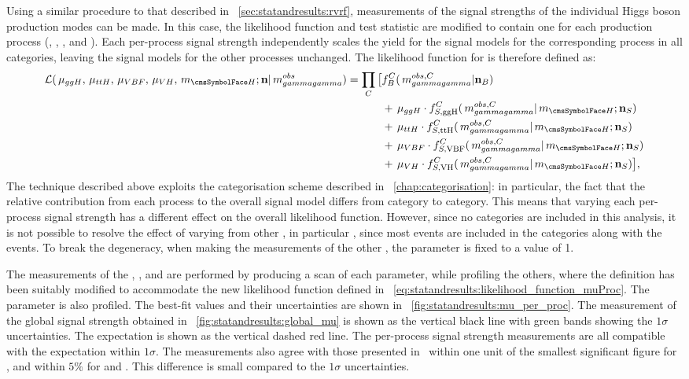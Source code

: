 Using a similar procedure to that described in \Sec~\ref{sec:statandresults:rvrf}, measurements of the signal strengths of the individual Higgs boson production modes can be made. In this case, the likelihood function and test statistic are modified to contain one \POI for each production process (\muggH, \muVBF, \muVH, and \muttH). Each per-process signal strength independently scales the yield for the signal models for the corresponding process in all categories, leaving the signal models for the other processes unchanged. The likelihood function for is therefore defined as:
\begin{equation}
\label{eq:statandresults:likelihood_function_muProc}
\begin{split}
\mathcal{L}(\muggH, \muttH,\muVBF,\muVH, \mH; \mathbf{n} | \mgg^{obs} ) = \prod_C \big[{} &f^C_B(\mgg^{obs,C} | \mathbf{n}_B ) \\ 
&+\muggH\cdot f^C_{S,{\text{ggH}}}(\mgg^{obs,C} |\mH; \mathbf{n}_S) \\ 
&+\muttH\cdot f^C_{S,{\text{ttH}}}(\mgg^{obs,C} |\mH; \mathbf{n}_S) \\ 
&+\muVBF\cdot f^C_{S,{\text{VBF}}}(\mgg^{obs,C} |\mH; \mathbf{n}_S) \\
&+\muVH \cdot f^C_{S,{\text{VH}}}(\mgg^{obs,C} |\mH; \mathbf{n}_S){}\big], \\ 
\end{split}
\end{equation}
The technique described above exploits the categorisation scheme described in \Chapter~\ref{chap:categorisation}: in particular, the fact that the relative contribution from each process to the overall signal model differs from category to category. This means that varying each per-process signal strength has a different effect on the overall likelihood function. However, since no \VHTag categories are included in this analysis, it is not possible to resolve the effect of varying \muVH from other \POI\s, in particular \muggH, since most \VH events are included in the \Untagged categories along with the \ggH events. To break the degeneracy, when making the measurements of the other \POI\s, the parameter \muVH is fixed to a value of 1. 

The measurements of the \muggH, \muVBF, and \muttH are performed by producing a \DNLL scan of each parameter, while profiling the others, where the \DNLL definition has been suitably modified to accommodate the new likelihood function defined in \Eq~\ref{eq:statandresults:likelihood_function_muProc}. The \mH parameter is also profiled. The best-fit values and their uncertainties are shown in \Fig~\ref{fig:statandresults:mu_per_proc}. The measurement of the global signal strength obtained in \Sec~\ref{fig:statandresults:global_mu} is shown as the vertical black line with green bands showing the $1\sigma$ uncertainties. The \SM expectation is shown as the vertical dashed red line. The per-process signal strength measurements are all compatible with the \SM expectation within $1\sigma$. The measurements also agree with those presented in~\cite{CMS-PAS-HIG-16-020} within one unit of the smallest significant figure for \muggH, and within $5\%$ for \muVBF and \muttH. This difference is small compared to the $1\sigma$ uncertainties. 

